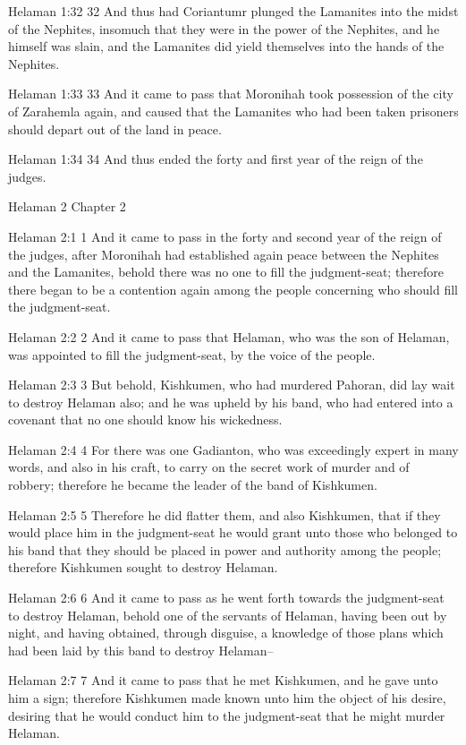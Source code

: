 Helaman 1:32
 32 And thus had Coriantumr plunged the Lamanites into the midst
of the Nephites, insomuch that they were in the power of the
Nephites, and he himself was slain, and the Lamanites did yield
themselves into the hands of the Nephites.

Helaman 1:33
 33 And it came to pass that Moronihah took possession of the
city of Zarahemla again, and caused that the Lamanites who had
been taken prisoners should depart out of the land in peace.

Helaman 1:34
 34 And thus ended the forty and first year of the reign of the
judges.

Helaman 2
Chapter 2

Helaman 2:1
 1 And it came to pass in the forty and second year of the reign
of the judges, after Moronihah had established again peace
between the Nephites and the Lamanites, behold there was no one
to fill the judgment-seat; therefore there began to be a
contention again among the people concerning who should fill the
judgment-seat.

Helaman 2:2
 2 And it came to pass that Helaman, who was the son of Helaman,
was appointed to fill the judgment-seat, by the voice of the
people.

Helaman 2:3
 3 But behold, Kishkumen, who had murdered Pahoran, did lay wait
to destroy Helaman also; and he was upheld by his band, who had
entered into a covenant that no one should know his wickedness.

Helaman 2:4
 4 For there was one Gadianton, who was exceedingly expert in
many words, and also in his craft, to carry on the secret work of
murder and of robbery; therefore he became the leader of the band
of Kishkumen.

Helaman 2:5
 5 Therefore he did flatter them, and also Kishkumen, that if
they would place him in the judgment-seat he would grant unto
those who belonged to his band that they should be placed in
power and authority among the people; therefore Kishkumen sought
to destroy Helaman.

Helaman 2:6
 6 And it came to pass as he went forth towards the judgment-seat
to destroy Helaman, behold one of the servants of Helaman, having
been out by night, and having obtained, through disguise, a
knowledge of those plans which had been laid by this band to
destroy Helaman--

Helaman 2:7
 7 And it came to pass that he met Kishkumen, and he gave unto
him a sign; therefore Kishkumen made known unto him the object of
his desire, desiring that he would conduct him to the
judgment-seat that he might murder Helaman.

